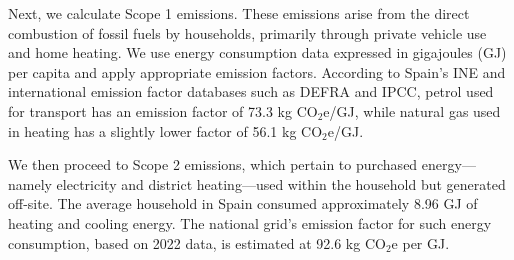 \documentclass[12pt,a4paper]{article}%
\begin{document}
Next, we calculate Scope 1 emissions. These emissions arise from the direct combustion of fossil fuels by households, primarily through private vehicle use and home heating. We use energy consumption data expressed in gigajoules (GJ) per capita and apply appropriate emission factors. According to Spain’s INE and international emission factor databases such as DEFRA and IPCC, petrol used for transport has an emission factor of 73.3 kg CO$_2$e/GJ, while natural gas used in heating has a slightly lower factor of 56.1 kg CO$_2$e/GJ.


\begin{table}[h]
\centering
\caption*{\textbf{Table 4.1}: Direct Emissions from Household Energy and Transport (Scope 1)}\label{tab:scope1}
\end{table}


We then proceed to Scope 2 emissions, which pertain to purchased energy—namely electricity and district heating—used within the household but generated off-site. The average household in Spain consumed approximately 8.96 GJ of heating and cooling energy. The national grid's emission factor for such energy consumption, based on 2022 data, is estimated at 92.6 kg CO$_2$e per GJ.

\begin{table}[h]
\centering
\caption*{\textbf{Table 4.2:} Indirect Emissions from Heating and Cooling (Scope 2)}\label{tab:scope2}
\end{table}
\end{document}
